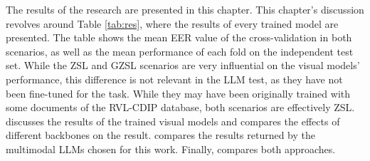 The results of the research are presented in this chapter. This chapter's discussion revolves around Table \ref{tab:res}, where the results of every trained model are presented. The table shows the mean EER value of the cross-validation in both scenarios, as well as the mean performance of each fold on the independent test set. While the \gls{ZSL} and \gls{GZSL} scenarios are very influential on the visual models' performance, this difference is not relevant in the \gls{LLM} test, as they have not been fine-tuned for the task. While they may have been originally trained with some documents of the RVL-CDIP database, both scenarios are effectively \gls{ZSL}.  discusses the results of the trained visual models and compares the effects of different backbones on the result.  compares the results returned by the multimodal \glspl{LLM} chosen for this work. Finally,  compares both approaches.

